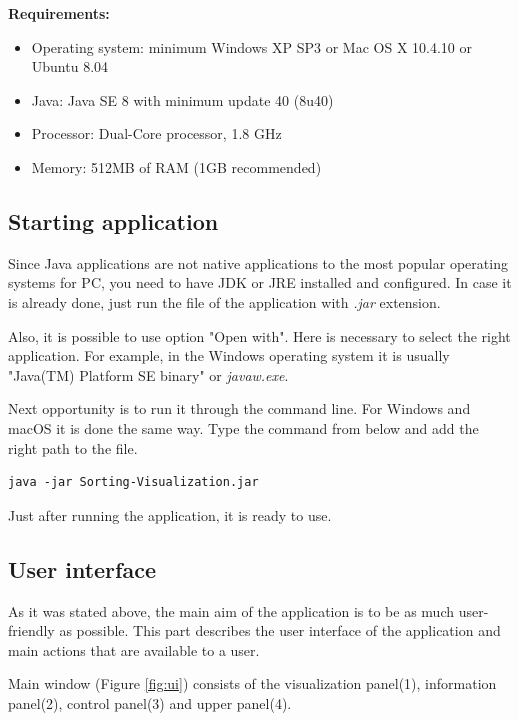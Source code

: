 \documentclass[
  field=inf,
  biblatex,
  language=english,
  glossaries,
  theorems=false,
  index
]{kidiplom}
\begin{document}
\noindent \textbf{Requirements:}
\begin{itemize}
	\item Operating system: minimum Windows XP SP3 or Mac OS X 10.4.10 or Ubuntu 8.04 
	\item Java: Java SE 8 with minimum update 40 (8u40)
	\item Processor: Dual-Core processor, 1.8 GHz
	\item Memory: 512MB of RAM (1GB recommended)
\end{itemize}

\subsection{Starting application}

Since Java applications are not native applications to the most popular operating systems for PC, you need to have JDK or JRE installed and configured. In case it is already done, just run the file of the application with \textit{.jar} extension.

Also, it is possible to use option "Open with". Here is necessary to select the right application. For example, in the Windows operating system it is usually "Java(TM) Platform SE binary" or \textit{javaw.exe}.

Next opportunity is to run it through the command line. For Windows and macOS it is done the same way. Type the command from below and add the right path to the file. 
\begin{lstlisting}
java -jar Sorting-Visualization.jar
\end{lstlisting}

Just after running the application, it is ready to use.

\subsection{User interface}

As it was stated above, the main aim of the application is to be as much user-friendly as possible. This part describes the user interface of the application and main actions that are available to a user.

Main window (Figure \ref{fig:ui}) consists of the visualization panel(1), information panel(2), control panel(3) and upper panel(4).
\end{document}
